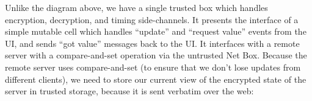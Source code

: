 \documentclass{article}
\newcommand{\trusted}[1]{*++[o][F=]{#1}}
\newcommand{\untrusted}[1]{*++[o][F-]{#1}}
\newcommand{\fullwidth}[1]{\noindent\checkoddpage\makebox[0pt][r]{\makebox[\dimexpr1in+\hoffset+\ifoddpage\oddsidemargin\else\evensidemargin\fi][l]{#1}}}
\newcommand{\truecenter}[1]{\fullwidth{\parbox[c]{\paperwidth}{#1}}}
\begin{document}
Unlike the diagram above, we have a single trusted box which handles encryption, decryption, and timing side-channels.  It presents the interface of a simple mutable cell which handles ``update'' and ``request value'' events from the UI, and sends ``got value'' messages back to the UI.  It interfaces with a remote server with a compare-and-set operation via the untrusted Net Box.  Because the remote server uses compare-and-set (to ensure that we don't lose updates from different clients), we need to store our current view of the encrypted state of the server in trusted storage, because it is sent verbatim over the web:

{%
\def\untrusted#1{\save[].[#1]*[F]\frm{}\restore}
\def\trusted#1{\save[].[#1]*[F=]\frm{}\restore}
\truecenter{
\[
\mbox{\xymatrix@-1pc{
&&&&&\ar[dd]{\txt{system tick}}\\
&\untrusted{ddddddrrrrrrrr} \\
&&\untrusted{dddd}\txt{\phantom{UI}}&&\trusted{ddddrrr}\txt{\rlap{Server Emulator}}&\txt{\phantom{Decrypt}}&\txt{\phantom{Timing}}&&\untrusted{dddd}\txt{\phantom{Net}}&& \\
&&\txt{\phantom{UI}}\ar[rr]^{\txt{update}}&&\ar[r]&\trusted{}\txt{Encrypt}\ar[r]&\trusted{}\txt{Timing}\ar[rr]&&\txt{\phantom{Net}}\ar@{=>}[rr]&&\txt{Compare and Set} \\
\ar@{=>}[rr]{\txt{User In}}&&\txt{UI}\ar[rr]^{\txt{get}}&&\ar[rr]&\txt{\phantom{Decrypt}}&\trusted{}\txt{Timing}\ar[rr]&&\txt{Net}\ar@{=>}[rr]&&\txt{Get} \\
&&\txt{\phantom{UI}}\ar@{<-}[rr]^{\txt{gotten}}&&\ar@{<-}[r]&\trusted{}\txt{Decrypt}\ar@{<-}[rrr]&\txt{\phantom{Timing}}&&\txt{\phantom{Net}}\ar@{<=}[rr]&&\txt{Server Response} \\
&&\txt{\phantom{UI}}&&&\txt{\phantom{Decrypt}}&\txt{\phantom{Timing}}&&\txt{\phantom{Net}}&& \\
&&\txt{\phantom{UI}}&&&\txt{\phantom{Decrypt}}&\txt{\phantom{Timing}}&&\txt{\phantom{Net}}&& \\
}}
\]
}}
\end{document}
